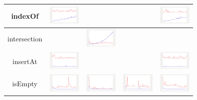 \begin{longtable}{ c|c c c c}
indexOf
&
\includegraphics[width=1.6cm]{../graphs/sequence/small/IndexOf}
&
&
&
\includegraphics[width=1.6cm]{../graphs/orderedset/small/IndexOf}
\\\hline

intersection
&
&
\includegraphics[width=1.6cm]{../graphs/set/small/Intersection}
&
&
\\\hline

insertAt
&
\includegraphics[width=1.6cm]{../graphs/sequence/small/InsertAt}
&
&
&
\includegraphics[width=1.6cm]{../graphs/orderedset/small/InsertAt}
\\\hline

isEmpty
&
\includegraphics[width=1.6cm]{../graphs/sequence/small/IsEmpty}
&
\includegraphics[width=1.6cm]{../graphs/set/small/IsEmpty}
&
\includegraphics[width=1.6cm]{../graphs/bag/small/IsEmpty}
&
\includegraphics[width=1.6cm]{../graphs/orderedset/small/IsEmpty}
\\\hline


\end{longtable}
